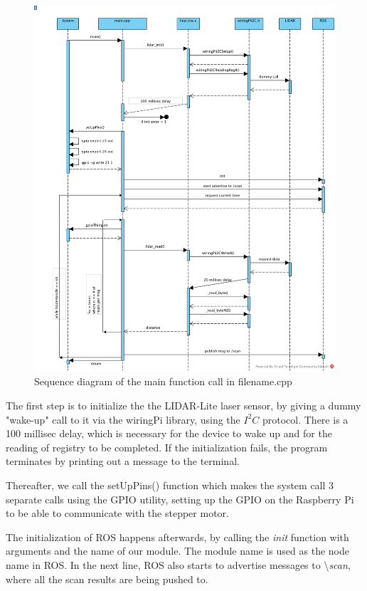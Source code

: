 \begin{figure}[H]
	\centering
	\includegraphics[scale=.6]{images/laser-module.png}
	\caption{Sequence diagram of the main function call in filename.cpp}
	\label{fig:lasermodule}
\end{figure}

The first step is to initialize the the LIDAR-Lite laser sensor, by giving a dummy "wake-up" call to it via the wiringPi library, using the $I^2C$ protocol. There is a 100 millisec delay, which is necessary for the device to wake up and for the reading of registry to be completed. If the initialization fails, the program terminates by printing out a message to the terminal.

Thereafter, we call the setUpPins() function which makes the system call 3 separate calls using the GPIO utility, setting up the GPIO on the Raspberry Pi to be able to communicate with the stepper motor.

The initialization of ROS happens afterwards, by calling the \textit{init} function with arguments and the name of our module. The module name is used as the node name in ROS. In the next line, ROS also starts to advertise messages to \textbackslash\textit{scan}, where all the scan results are being pushed to.

